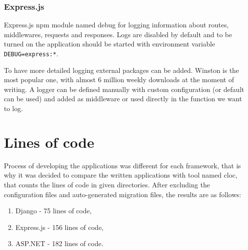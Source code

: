 \subsubsection{Express.js}

Express.js \acrshort{npm} module named debug for logging information about routes, middlewares, requests and responses. Logs are disabled by default and to be turned on the application should be started with environment variable \lstinline{DEBUG=express:*}.

To have more detailed logging external packages can be added. Winston is the most popular one, with almost 6 million weekly downloads at the moment of writing. A logger can be defined manually with custom configuration (or default can be used) and added as middleware or used directly in the function we want to log.

\section{Lines of code}

Process of developing the applications was different for each framework, that is why it was decided to compare the written applications with tool named \acrshort{cloc}, that counts the lines of code in given directories. After excluding the configuration files and auto-generated migration files, the results are as follows:
\begin{enumerate}
      \item Django - 75 lines of code,
      \item Express.js - 156 lines of code,
      \item ASP.NET - 182 lines of code.
\end{enumerate}
